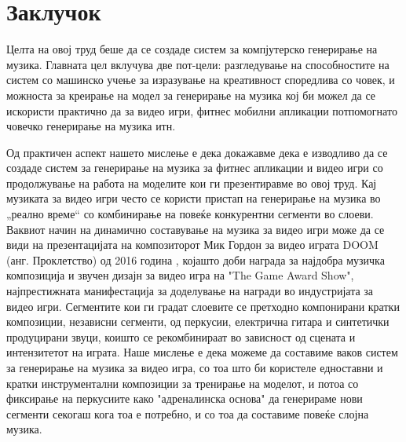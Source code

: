 \chapter{Заклучок}
\label{ch:zaklucok}

Целта на овој труд беше да се создаде систем за компјутерско генерирање на музика. Главната цел вклучува две пот-цели: разгледување на способностите на систем со машинско учење за изразување на креативност споредлива со човек, и можноста за креирање на модел за генерирање на музика кој би можел да се искористи практично да за видео игри, фитнес мобилни апликации потпомогнато човечко генерирање на музика итн. 

Од практичен аспект нашето мислење е дека докажавме дека е изводливо да се создаде систем за генерирање на музика за фитнес апликации и видео игри со продолжување на работа на моделите кои ги презентиравме во овој труд. Кај музиката за видео игри често се користи пристап на генерирање на музика во „реално време“ со комбинирање на повеќе конкурентни сегменти во слоеви. Ваквиот начин на динамично составување на музика за видео игри може да се види на презентацијата на композиторот Мик Гордон за видео играта DOOM (анг. Проклетство) од 2016 година \cite{Gordon2017}, којашто доби награда за најдобра музичка композиција и звучен дизајн за видео игра на "The Game Award Show", најпрестижната манифестација за доделување на награди во индустријата за видео игри. Сегментите кои ги градат слоевите се претходно компонирани кратки композиции, независни сегменти, од перкусии, електрична гитара и синтетички продуцирани звуци, коишто се рекомбинираат во зависност од сцената и интензитетот на играта. Наше мислење е дека можеме да составиме ваков систем за генерирање на музика за видео игра, со тоа што би користеле едноставни и кратки инструментални композиции за тренирање на моделот, и потоа со фиксирање на перкусиите како "адреналинска основа" да генерираме нови сегменти секогаш кога тоа е потребно, и со тоа да составиме повеќе слојна музика. 

